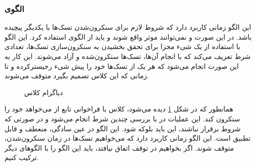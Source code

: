 \subsubsection{الگوی }
\label{scheduleRendezvousSec}
\begin{RTL}
این الگو \cite{ref1} زمانی کاربرد دارد که شروط لازم برای
سنکرون‌شدن تسک‌ها با یکدیگر پیچیده باشد.
در این صورت  و
 نمی‌توانند موثر واقع شوند و باید از
الگوی  استفاده کرد.
این الگو با استفاده از یک شیء مجزا برای تحقق بخشیدن به سنکرون‌سازی تسک‌ها،
تعدادی شرط تعریف می‌کند که با انجام آن‌ها، تسک‌ها سنکرون‌شده و آزاد می‌شوند.
این کار به این صورت انجام می‌شود که هر یک از تسک‌ها خود را پیش شیء
 رجیسترکرده و تا زمانی که این کلاس تصمیم بگیرد
متوقف می‌شوند.
\end{RTL}
\begin{figure}[h!]
\centering
{}
\caption{دیاگرام کلاس }
\label{scheduleRendezvousClassDiag}
\end{figure}
\begin{RTL}
همانطور که در شکل \ref{scheduleRendezvousClassDiag}
دیده می‌شود، کلاس  با فراخوانی
تابع  از  می‌خواهد خود را
سنکرون کند. این عملیات در  با بررسی چندین شرط
انجام می‌شود و در صورتی که شروط برقرار نباشند، این  باید
بلوکه شود.
این الگو در عین سادگی، منعطف و قابل تطبیق است. این الگو زمانی کاربرد دارد
که می‌خواهیم تسک‌ها در زمان سنکرون‌شدن، متوقف شوند. اگر بخواهیم در توقف
اتفاق نیافتد، باید این الگو را با الگوهای دیگر ترکیب کنیم.
\end{RTL}